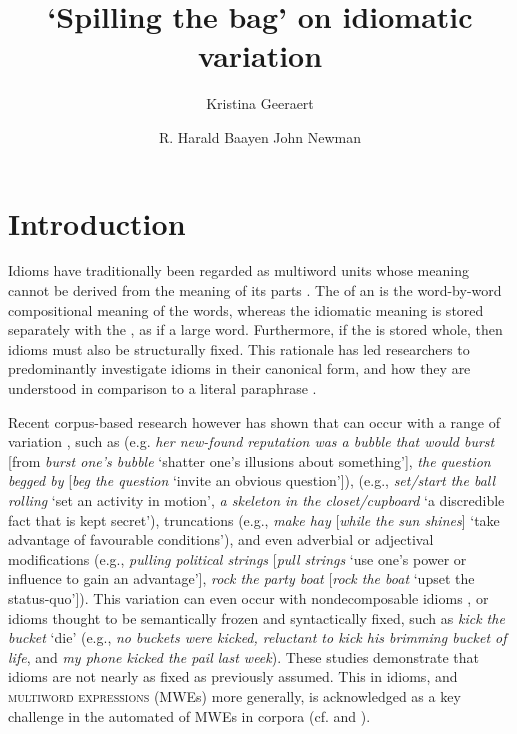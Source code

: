 \documentclass[output=paper
,modfonts
,nonflat]{langsci/langscibook}
\title{`Spilling the bag' on idiomatic variation}
\author{%
 Kristina Geeraert\affiliation{KU Leuven}\and 
 R. Harald Baayen\affiliation{University of T\"ubingen \& University of Alberta}\lastand 
 John Newman\affiliation{University of Alberta \& Monash University}
}
\begin{document}
\maketitle
\label{GEERAERT-CHAPTER}

\section{Introduction} 


Idioms  have traditionally been regarded as multiword units  whose meaning cannot be derived from the meaning of its parts \citep{BobrowBell1973}. The  of an  is the word-by-word compositional  meaning of the words, whereas the idiomatic meaning is stored separately with the , as if a large word. Furthermore, if the  is stored whole, then idioms must also be structurally fixed. This rationale has led researchers to predominantly investigate idioms in their canonical form, and how they are understood in comparison to a literal paraphrase \citep{SwinneyCutler1979, Gibbs1980, CacciariTabossi1988, TitoneConnine1999}.

Recent corpus-based research however has shown that  can occur with a range of variation   \citep{Moon1998, Barlow2000, Langlotz2006, Schroder2013}, such as  (e.g. \textit{her new-found reputation was a bubble that would burst} [from \textit{burst one's bubble} `shatter one's illusions about something'], \textit{the question begged by} [\textit{beg the question} `invite an obvious question']),  (e.g., \textit{set/start the ball rolling} `set an activity in motion', \textit{a skeleton in the closet/cupboard} `a discredible fact that is kept secret'), truncations  (e.g., \textit{make hay} [\textit{while the sun shines}] `take advantage of favourable conditions'), and even adverbial or adjectival modifications  (e.g., \textit{pulling political strings} [\textit{pull strings} `use one's power or influence to gain an advantage'], \textit{rock the party boat} [\textit{rock the boat} `upset the status-quo']). This variation can even occur with nondecomposable idioms \citep{Duffley2013}, or idioms thought to be semantically frozen and syntactically fixed, such as \textit{kick the bucket} `die' (e.g., \textit{no buckets were kicked, reluctant to kick his brimming bucket of life}, and \textit{my phone kicked the pail last week}). These studies demonstrate that idioms are not nearly as fixed as previously assumed. This  in idioms, and \textsc{multiword expressions} (MWEs)  more generally, is acknowledged as a key challenge in the automated  of MWEs in corpora (cf.   and  ).
\end{document}
